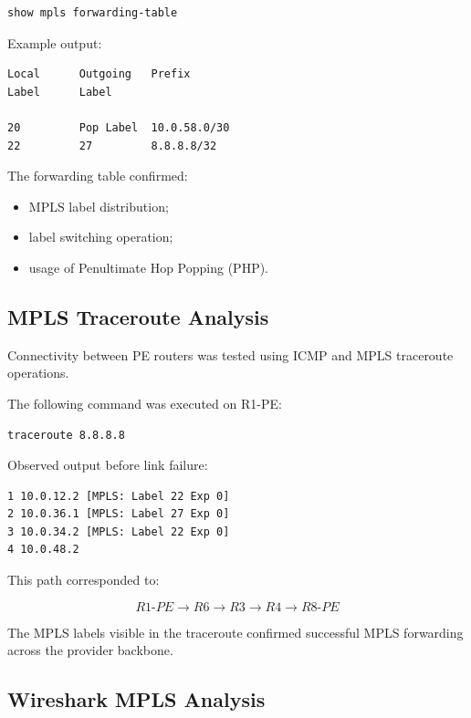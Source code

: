 \documentclass[12pt]{article}
\begin{document}
\begin{lstlisting}
show mpls forwarding-table
\end{lstlisting}

Example output:

\begin{lstlisting}
Local      Outgoing   Prefix
Label      Label

20         Pop Label  10.0.58.0/30
22         27         8.8.8.8/32
\end{lstlisting}

The forwarding table confirmed:
\begin{itemize}
    \item MPLS label distribution;
    \item label switching operation;
    \item usage of Penultimate Hop Popping (PHP).
\end{itemize}

\subsection{MPLS Traceroute Analysis}

Connectivity between PE routers was tested using ICMP and MPLS traceroute operations.

The following command was executed on R1-PE:

\begin{lstlisting}
traceroute 8.8.8.8
\end{lstlisting}

Observed output before link failure:

\begin{lstlisting}
1 10.0.12.2 [MPLS: Label 22 Exp 0]
2 10.0.36.1 [MPLS: Label 27 Exp 0]
3 10.0.34.2 [MPLS: Label 22 Exp 0]
4 10.0.48.2
\end{lstlisting}

This path corresponded to:

\[
R1\text{-}PE \rightarrow R6 \rightarrow R3 \rightarrow R4 \rightarrow R8\text{-}PE
\]

The MPLS labels visible in the traceroute confirmed successful MPLS forwarding across the provider backbone.

\subsection{Wireshark MPLS Analysis}
\end{document}
